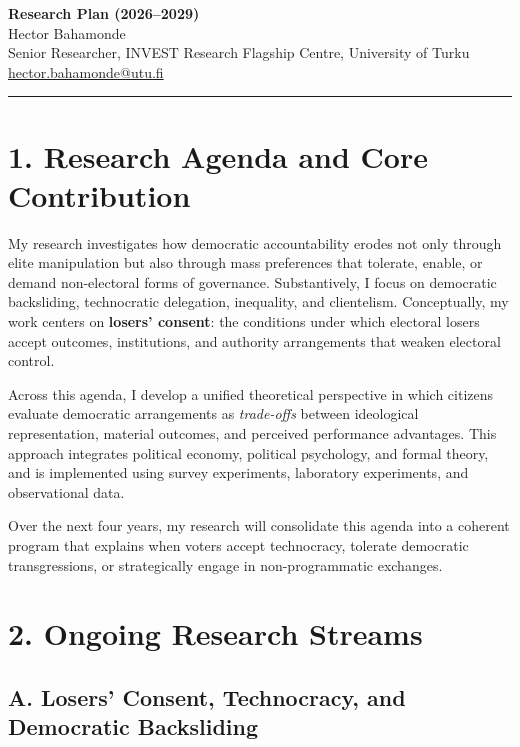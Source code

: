 \documentclass[letterpaper,11pt]{article}
\begin{document}
\vspace*{-0.6cm}

{\Large \textbf{Research Plan (2026--2029)}}\\
{\normalsize Hector Bahamonde}\\
{\normalsize Senior Researcher, INVEST Research Flagship Centre, University of Turku}\\
{\normalsize \href{mailto:hector.bahamonde@utu.fi}{hector.bahamonde@utu.fi}}

\noindent\rule[0.5ex]{\linewidth}{0.4pt}

\section*{1. Research Agenda and Core Contribution}

My research investigates how democratic accountability erodes not only through elite manipulation but also through mass preferences that tolerate, enable, or demand non-electoral forms of governance. Substantively, I focus on democratic backsliding, technocratic delegation, inequality, and clientelism. Conceptually, my work centers on \textbf{losers’ consent}: the conditions under which electoral losers accept outcomes, institutions, and authority arrangements that weaken electoral control.

Across this agenda, I develop a unified theoretical perspective in which citizens evaluate democratic arrangements as \emph{trade-offs} between ideological representation, material outcomes, and perceived performance advantages. This approach integrates political economy, political psychology, and formal theory, and is implemented using survey experiments, laboratory experiments, and observational data.

Over the next four years, my research will consolidate this agenda into a coherent program that explains when voters accept technocracy, tolerate democratic transgressions, or strategically engage in non-programmatic exchanges.

\section*{2. Ongoing Research Streams}

\subsection*{A. Losers’ Consent, Technocracy, and Democratic Backsliding}
\end{document}
